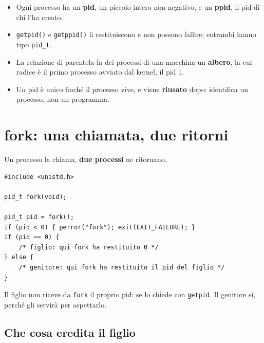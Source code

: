 
\begin{itemize}
    \item Ogni processo ha un \textbf{pid}, un piccolo intero non negativo, e un \textbf{ppid}, il pid di chi l'ha creato.
    \item \texttt{getpid()} e \texttt{getppid()} li restituiscono e non possono fallire; entrambi hanno tipo \texttt{pid\_t}.
    \item La relazione di parentela fa dei processi di una macchina un \textbf{albero}, la cui radice è il primo processo
          avviato dal kernel, il pid 1.
    \item Un pid è unico finché il processo vive, e viene \textbf{riusato} dopo: identifica un processo, non un programma.
\end{itemize}

\section{fork: una chiamata, due ritorni}

Un processo la chiama, \textbf{due processi} ne ritornano.

\begin{lstlisting}[language={[POSIX]C}, style=wnumbers, title={La forma di ogni fork}]
#include <unistd.h>

pid_t fork(void);

pid_t pid = fork();
if (pid < 0) { perror("fork"); exit(EXIT_FAILURE); }
if (pid == 0) {
    /* figlio: qui fork ha restituito 0 */
} else {
    /* genitore: qui fork ha restituito il pid del figlio */
}
\end{lstlisting}

Il figlio non riceve da \texttt{fork} il proprio pid: se lo chiede con \texttt{getpid}. Il genitore sì, perché gli servirà
per aspettarlo.

\subsection{Che cosa eredita il figlio}

